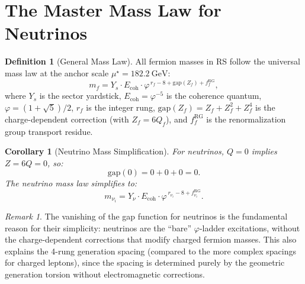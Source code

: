 \documentclass[12pt,a4paper]{article}
\newtheorem{corollary}[theorem]{Corollary}
\theoremstyle{definition}
\newtheorem{definition}[theorem]{Definition}
\theoremstyle{remark}
\newtheorem{remark}[theorem]{Remark}
\begin{document}
\section{The Master Mass Law for Neutrinos}
\label{sec:mass-law}

\begin{definition}[General Mass Law]
\label{def:mass-law}
All fermion masses in RS follow the universal mass law at the
anchor scale $\mu^\star = 182.2~\mathrm{GeV}$:
\begin{equation}
  m_f = Y_s \cdot E_{\mathrm{coh}} \cdot
  \varphi^{\,r_f - 8 + \mathrm{gap}(Z_f) + f^{\mathrm{RG}}_f},
  \label{eq:mass-law}
\end{equation}
where $Y_s$ is the sector yardstick, $E_{\mathrm{coh}} =
\varphi^{-5}$ is the coherence quantum,
$\varphi = (1+\sqrt{5})/2$, $r_f$ is the integer rung,
$\mathrm{gap}(Z_f) = Z_f + Z_f^2 + Z_f^4$ is the
charge-dependent correction (with $Z_f = 6Q_f$), and
$f^{\mathrm{RG}}_f$ is the renormalization group transport
residue.
\end{definition}

\begin{corollary}[Neutrino Mass Simplification]
\label{thm:nu-simple}
For neutrinos, $Q = 0$ implies $Z = 6Q = 0$, so:
\begin{equation}
  \mathrm{gap}(0) = 0 + 0 + 0 = 0.
\end{equation}
The neutrino mass law simplifies to:
\begin{equation}
  \boxed{m_{\nu_i} = Y_\nu \cdot E_{\mathrm{coh}} \cdot
  \varphi^{\,r_{\nu_i} - 8 + f^{\mathrm{RG}}_{\nu_i}}.}
  \label{eq:nu-mass}
\end{equation}
\end{corollary}

\begin{remark}
The vanishing of the gap function for neutrinos is the
fundamental reason for their simplicity: neutrinos are the
``bare'' $\varphi$-ladder excitations, without the
charge-dependent corrections that modify charged fermion
masses.  This also explains the 4-rung generation spacing
(compared to the more complex spacings for charged leptons),
since the spacing is determined purely by the geometric
generation torsion without electromagnetic corrections.
\end{remark}

\end{document}
